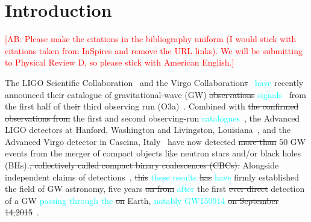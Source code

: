 \documentclass[twocolumn,prd,aps,superscriptaddress,preprintnumbers,tightenlines,showpacs,nofootinbib,eqsecnum,amsfonts,amsmath]{revtex4-1}
\newcommand{\ab}[1]{\textcolor{cyan}{#1}}
\newcommand{\comment}[1]{\textcolor{red}{[#1]}}
\begin{document}
\maketitle


\section{Introduction}\label{sec:intro}

\comment{AB: Please make the citations in the bibliography uniform (I would stick with citations 
taken from InSpires and remove the URL links). We will be submitting to Physical Review D, so please 
stick with American English.}

The LIGO Scientific Collaboration~\citep{lsc} and the Virgo
Collaboration\sout{s}~\citep{Virgo} \ab{have} recently announced their catalogue of
gravitational-wave (GW) \sout{observations} \ab{signals}~\citep{GWTC-2} from the first
half of the\sout{ir} third observing run (O3a)~\citep{O3reference}. Combined
with \sout{the confirmed observations from} the first and second observing-run \ab{catalogues}~\citep{abbott2019gwtc}, the Advanced LIGO detectors at Hanford,
Washington and Livingston, Louisiana~\citep{aasi2015characterization},
and the Advanced Virgo detector in Cascina,
Italy~\citep{acernese2014advanced} have now detected \sout{more than} $50$ GW
events from the merger of compact objects like neutron stars and/or
black holes (BHs).\sout{, collectively called compact binary coalescences
(CBCs).} Alongside independent claims of
detections~\citep{nitz20191,nitz20202,2019PhRvD.100b3007Z,2020PhRvD.101h3030V,Venumadhav_2020},
\sout{this} \ab{these results} \sout{has} \ab{have} firmly established the field of GW astronomy, five years \sout{on
from} \ab{after} the first \sout{ever direct} detection of a GW \ab{passing through the} \sout{on} Earth, \ab{notably GW150914} 
\sout{on September 14,2015}~\citep{abbott2016observation}.
\end{document}
